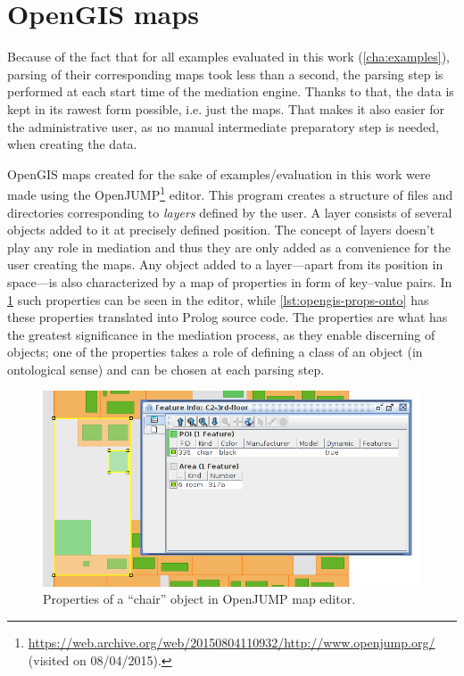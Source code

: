 \section{OpenGIS maps}

Because of the fact that for all examples evaluated in this work (\cref{cha:examples}), parsing of their corresponding maps took less than a second, the parsing step is performed at each start time of the mediation engine. Thanks to that, the data is kept in its rawest form possible, i.e. just the maps. That makes it also easier for the administrative user, as no manual intermediate preparatory step is needed, when creating the data.

OpenGIS maps created for the sake of examples/evaluation in this work were made using the OpenJUMP\footnote{\url{https://web.archive.org/web/20150804110932/http://www.openjump.org/} (visited on 08/04/2015).} editor. This program creates a structure of files and directories corresponding to \emph{layers} defined by the user. A layer consists of several objects added to it at precisely defined position. The concept of layers doesn't play any role in mediation and thus they are only added as a convenience for the user creating the maps. Any object added to a layer---apart from its position in space---is also characterized by a map of properties in form of key--value pairs. In \cref{fig:opengis-props-map} such properties can be seen in the editor, while \cref{lst:opengis-props-onto} has these properties translated into Prolog source code. The properties are what has the greatest significance in the mediation process, as they enable discerning of objects; one of the properties takes a role of defining a class of an object (in ontological sense) and can be chosen at each parsing step.

\begin{figure}
	\centering
	\includegraphics[width=\textwidth]{opengis-props-map}
	\caption{Properties of a ``chair'' object in OpenJUMP map editor.}
	\label{fig:opengis-props-map}
\end{figure}

